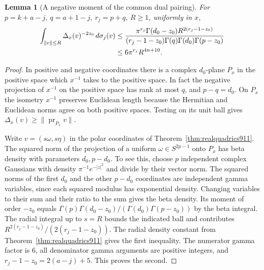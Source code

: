 \documentclass[a4paper,11pt]{article}
\newtheorem{lemma}[proposition]{Lemma}
\theoremstyle{definition}
\theoremstyle{remark}
\numberwithin{equation}{section}
\begin{document}
\begin{lemma}[A negative moment of the common dual pairing]
\leavevmode\label{lem:commondirection913}
For \(p=k+a-j,\ q=a+1-j,\ r_j=p+q,\ R\ge1\), uniformly in \(x\),
\begin{align}
 \int_{\|v\|\le R}\Delta_x(v)^{-2z_0}\,d\sigma_j(v)
 &\le\frac{\pi^{r_j}\Gamma(d_0-z_0)R^{2(r_j-1-z_0)}}
 {(r_j-1-z_0)\Gamma(q)\Gamma(d_0)\Gamma(p-z_0)} \notag\\
 &\le 6\pi^{r_j}R^{4n+10}.
 \label{eq:commondirection913}
\end{align}
\end{lemma}
\begin{proof}
In positive and negative coordinates there is a complex
\(d_0\)-plane \(P_x\) in the positive space which \(x^{-1}\)
takes to the positive space. In fact the negative projection
of \(x^{-1}\) on the positive space has rank at most \(q\),
and \(p-q=d_0\). On \(P_x\) the isometry \(x^{-1}\) preserves
Euclidean length because the Hermitian and Euclidean norms
agree on both positive spaces. Testing on its unit ball gives
\(\Delta_x(v)\ge\|\operatorname{pr}_{P_x}v\|\).

Write \(v=(s\omega,s\eta)\) in the polar coordinates of
Theorem~\ref{thm:realquadrics911}. The squared norm of the
projection of a uniform \(\omega\in S^{2p-1}\) onto \(P_x\)
has beta density with parameters \(d_0,p-d_0\).
To see this, choose \(p\) independent complex Gaussians with
density \(\pi^{-1}e^{-|z|^2}\) and divide by their vector
norm. The squared norms of the first \(d_0\) and the other
\(p-d_0\) coordinates are independent gamma variables, since
each squared modulus has exponential density. Changing
variables to their sum and their ratio to the sum gives the
beta density. Its moment of order \(-z_0\) equals
\(\Gamma(p)\Gamma(d_0-z_0)/(\Gamma(d_0)\Gamma(p-z_0))\)
by the beta integral. The radial integral up to \(s=R\)
bounds the indicated ball and contributes
\(R^{2(r_j-1-z_0)}/(2(r_j-1-z_0))\). The radial density
constant from Theorem~\ref{thm:realquadrics911} gives the
first inequality. The numerator gamma factor is \(6\), all
denominator gamma arguments are positive integers, and
\(r_j-1-z_0=2(a-j)+5\). This proves the second.
\end{proof}
\end{document}
